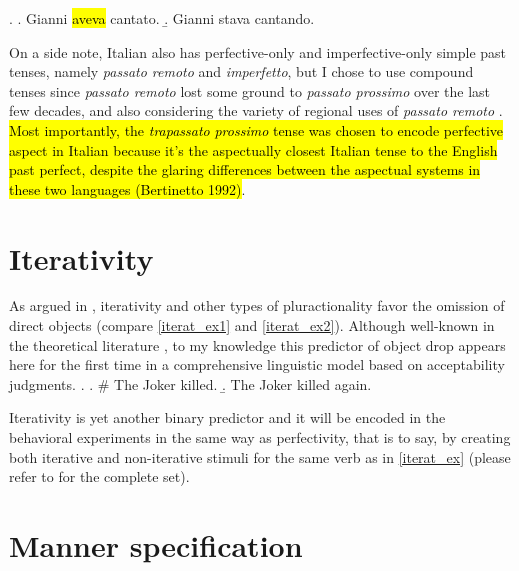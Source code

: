 \ex.\label{perf_ex_ita} \a. Gianni \hl{aveva} cantato. \label{perf_ex1_ita} 
\b. Gianni stava cantando. \label{perf_ex2_ita}

On a side note, Italian also has perfective-only and imperfective-only simple past tenses, namely \textit{passato remoto} and \textit{imperfetto}, but I chose to use compound tenses since \textit{passato remoto} lost some ground to \textit{passato prossimo} over the last few decades, and also considering the variety of regional uses of \textit{passato remoto} \parencite{bertinetto1996distribuzione}. \hl{Most importantly, the \textit{trapassato} \textit{prossimo} tense was chosen to encode perfective aspect in Italian because it's the aspectually closest Italian tense to the English past perfect, despite the glaring differences between the aspectual systems in these two languages (Bertinetto 1992)}.



\section{Iterativity} 

As argued in , iterativity and other types of pluractionality favor the omission of direct objects (compare \ref{iterat_ex1} and \ref{iterat_ex2}). Although well-known in the theoretical literature \parencite{Glass2013, Glass2020, Ruda2017}, to my knowledge this predictor of object drop appears here for the first time in a comprehensive linguistic model based on acceptability judgments.
\ex.\label{iterat_ex} \a. \# The Joker killed. \label{iterat_ex1} 
\b. The Joker killed again. \label{iterat_ex2}

Iterativity is yet another binary predictor and it will be encoded in the behavioral experiments in the same way as perfectivity, that is to say, by creating both iterative and non-iterative stimuli for the same verb as in \ref{iterat_ex} (please refer to  for the complete set).

\section{Manner specification} 

